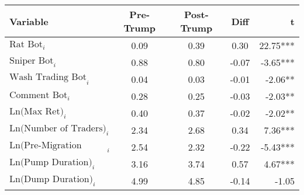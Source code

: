 \begin{tabular}{lcccr}
\toprule
Variable & Pre-Trump & Post-Trump & Diff & t \\
\midrule
$\text{Rat Bot}_{i}$ & 0.09 & 0.39 & 0.30 & 22.75*** \\
$\text{Sniper Bot}_{i}$ & 0.88 & 0.80 & -0.07 & -3.65*** \\
$\text{Wash Trading Bot}_{i}$ & 0.04 & 0.03 & -0.01 & -2.06** \\
$\text{Comment Bot}_{i}$ & 0.28 & 0.25 & -0.03 & -2.03** \\
$\text{Ln(Max Ret)}_{i}$ & 0.40 & 0.37 & -0.02 & -2.02** \\
$\text{Ln(Number of Traders)}_{i}$ & 2.34 & 2.68 & 0.34 & 7.36*** \\
$\text{Ln(Pre-Migration Duration)}_{i}$ & 2.54 & 2.32 & -0.22 & -5.43*** \\
$\text{Ln(Pump Duration)}_{i}$ & 3.16 & 3.74 & 0.57 & 4.67*** \\
$\text{Ln(Dump Duration)}_{i}$ & 4.99 & 4.85 & -0.14 & -1.05 \\
\bottomrule
\end{tabular}